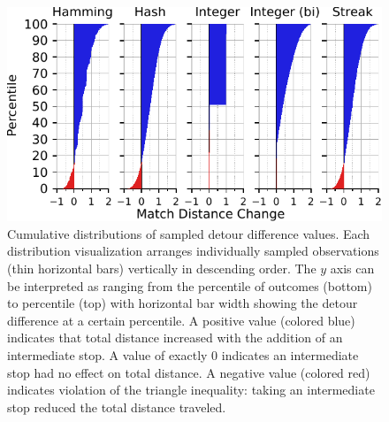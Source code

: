 \begin{figure}
\begin{center}
\includegraphics[width=\linewidth]{img/detour_difference/bitweight=0dot5+seed=1+title=low-triplet-analysis+_data_hathash_hash=6b0749ef97a58721+_script_fullcat_hash=2ded962cad675fe3+ext=}
\caption{
Cumulative distributions of sampled detour difference values.
Each distribution visualization arranges individually sampled observations (thin horizontal bars) vertically in descending order.
The $y$ axis can be interpreted as ranging from the  percentile of outcomes (bottom) to  percentile (top) with horizontal bar width showing the detour difference at a certain percentile.
A positive value (colored blue) indicates that total distance increased with the addition of an intermediate stop.
A value of exactly 0 indicates an intermediate stop had no effect on total distance.
A negative value (colored red) indicates violation of the triangle inequality: taking an intermediate stop reduced the total distance traveled.
}
\label{fig:detour_difference_supp}

\end{center}
\end{figure}
